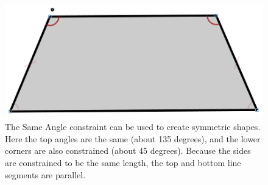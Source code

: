 \begin{figure}%
  \centering
  \includegraphics[width=0.7\linewidth]{img/same-angle-symmetry.png}
  \caption[Same Angle]{The Same Angle constraint can be used to create
    symmetric shapes. Here the top angles are the same (about 135
    degrees), and the lower corners are also constrained (about 45
    degrees). Because the sides are constrained to be the same length,
    the top and bottom line segments are parallel.}
  \label{fig:same-angle}
\end{figure}
